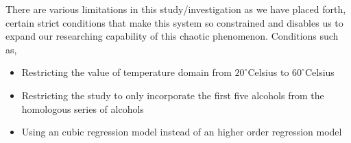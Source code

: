 {There are various limitations in this study/investigation as we have placed forth, certain strict conditions that make this system so constrained and disables us to expand our researching capability of this chaotic phenomenon. Conditions such as,}
        
    \begin{itemize}
        \item {Restricting the value of temperature domain from $20^\circ$Celsius to $60^\circ$Celsius}
        \item {Restricting the study to only incorporate the first five alcohols from the homologous series of alcohols}
        \item {Using an cubic regression model instead of an higher order regression model}
    \end{itemize}
        
        

